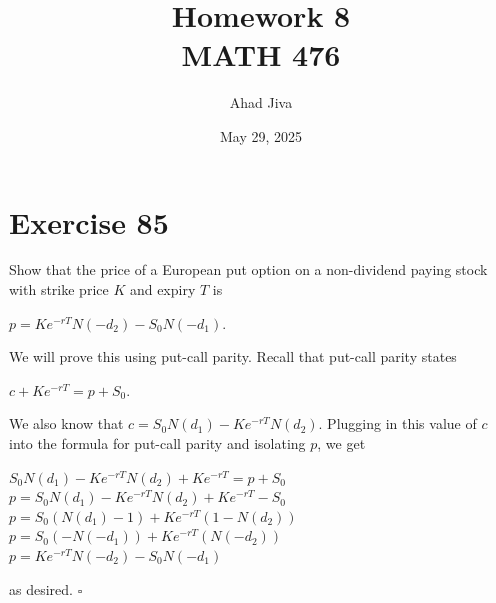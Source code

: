 \documentclass{article}
\title{Homework 8 \\ \large MATH 476}
\author{Ahad Jiva}
\date{May 29, 2025}
\begin{document}
\maketitle

\section*{Exercise 85}
\begin{flushleft}
    Show that the price of a European put option on a non-dividend paying stock with strike price $K$ and expiry $T$ is 
    \begin{center}
        $p=Ke^{-rT}N(-d_2)-S_0N(-d_1)$.
    \end{center}
 We will prove this using put-call parity. Recall that put-call parity states
\begin{center}
    $c + Ke^{-rT} = p + S_0$.
\end{center}
We also know that $c = S_0N(d_1) - Ke^{-rT}N(d_2)$. Plugging in this value of $c$ into the formula for put-call parity and isolating $p$, we get
\begin{center}
    $S_0N(d_1) - Ke^{-rT}N(d_2) + Ke^{-rT} = p + S_0$ \\
    $p = S_0N(d_1) - Ke^{-rT}N(d_2)+Ke^{-rT} - S_0$ \\
    $p = S_0 (N(d_1) - 1) + Ke^{-rT}(1-N(d_2))$ \\
    $p = S_0(-N(-d_1)) + Ke^{-rT}(N(-d_2))$ \\
    $p = Ke^{-rT}N(-d_2) - S_0N(-d_1)$
\end{center}
as desired. $\square$
\end{flushleft}
\end{document}
